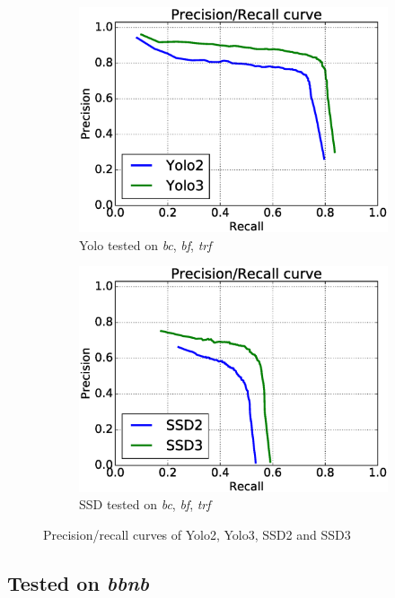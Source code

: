 \begin{figure}[h!]
\begin{subfigure}{.5\textwidth}
  \centering
  \includegraphics[width=0.8\linewidth]{results/case_buildings/prec_recall/yolo/bcbftrf.eps}
  \caption{Yolo tested on \textit{bc}, \textit{bf}, \textit{trf}}
  \label{fig:sfig1}
\end{subfigure}%
\begin{subfigure}{.5\textwidth}
  \centering
  \includegraphics[width=.8\linewidth]{results/case_buildings/prec_recall/ssd/bcbftrf.eps}
  \caption{SSD tested on \textit{bc}, \textit{bf}, \textit{trf}}
  \label{fig:sfig2}
\end{subfigure}
\caption{Precision/recall curves of Yolo2, Yolo3, SSD2 and SSD3}
\label{fig:case_build}
\end{figure}

\newpage


\subsection{Tested on \textit{bbnb}}

